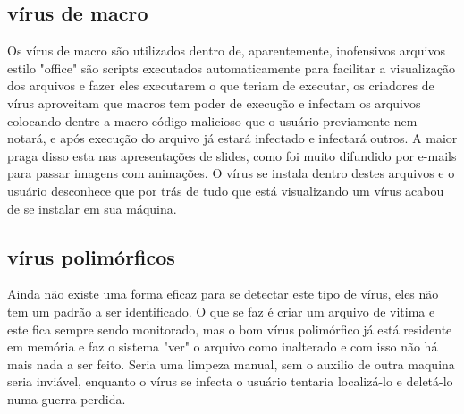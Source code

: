\subsection{vírus de macro}
	Os vírus de macro são utilizados dentro de, aparentemente, inofensivos arquivos  estilo "office" são scripts executados automaticamente para facilitar a visualização dos arquivos e fazer eles executarem o que teriam de executar, os criadores de vírus aproveitam que macros tem poder de execução e infectam os arquivos colocando dentre a macro código malicioso que o usuário previamente nem notará, e após execução do arquivo já estará infectado e infectará outros. A maior praga disso esta nas apresentações de slides, como foi muito difundido por e-mails para passar imagens com animações. O vírus se instala dentro destes arquivos e o usuário desconhece que por trás de tudo que está visualizando um vírus acabou de se instalar em sua máquina.
\subsection{vírus polimórficos}
	Ainda não existe uma forma eficaz para se detectar este tipo de vírus, eles não tem um padrão a ser identificado. O que se faz é criar um arquivo de vitima e este fica sempre sendo monitorado, mas o bom vírus polimórfico já está residente em memória e faz o sistema "ver" o arquivo como inalterado e com isso não há mais nada a ser feito. Seria uma limpeza manual, sem o auxilio de outra maquina seria inviável, enquanto o vírus se infecta o usuário tentaria localizá-lo e deletá-lo numa guerra perdida.

